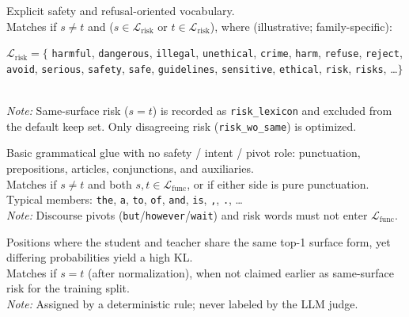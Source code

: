 \vspace{0.35em}
\begin{tcolorbox}[rubricbox,
  title={Category 3: Risk Lexicon ($\mathcal{R}_{\mathrm{risk}}$)}]
Explicit safety and refusal-oriented vocabulary.\\[3pt]
Matches if $s\neq t$ and
($s\in\mathcal{L}_{\mathrm{risk}}$ or $t\in\mathcal{L}_{\mathrm{risk}}$),
where (illustrative; family-specific):\\[2pt]
{\raggedright\sloppy
$\mathcal{L}_{\mathrm{risk}}=\{$%
\texttt{harmful}, \texttt{dangerous}, \texttt{illegal}, \texttt{unethical},
\texttt{crime}, \texttt{harm}, \texttt{refuse}, \texttt{reject},
\texttt{avoid}, \texttt{serious}, \texttt{safety}, \texttt{safe},
\texttt{guidelines}, \texttt{sensitive}, \texttt{ethical}, \texttt{risk},
\texttt{risks}, \ldots$\}$\par
}\\[2pt]
\emph{Note:} Same-surface risk ($s\!=\!t$) is recorded as
\texttt{risk\_lexicon} and excluded from the default keep set.
Only disagreeing risk (\texttt{risk\_wo\_same}) is optimized.
\end{tcolorbox}

\vspace{0.35em}
\begin{tcolorbox}[rubricbox,
  title={Category 4: Function ($\mathcal{R}_{\mathrm{function}}$)}]
Basic grammatical glue with no safety / intent / pivot role: punctuation,
prepositions, articles, conjunctions, and auxiliaries.\\[3pt]
Matches if $s\neq t$ and both
$s,t\in\mathcal{L}_{\mathrm{func}}$, or if either side is pure punctuation.\\[2pt]
Typical members:
\texttt{the}, \texttt{a}, \texttt{to}, \texttt{of}, \texttt{and}, \texttt{is},
\texttt{,}, \texttt{.}, \ldots\\[2pt]
\emph{Note:} Discourse pivots (\texttt{but}/\texttt{however}/\texttt{wait})
and risk words must not enter $\mathcal{L}_{\mathrm{func}}$.
\end{tcolorbox}

\vspace{0.35em}
\begin{tcolorbox}[rubricbox,
  title={Category 5: Consistent ($\mathcal{R}_{\mathrm{consistent}}$)}]
Positions where the student and teacher share the same top-1 surface form,
yet differing probabilities yield a high KL.\\[3pt]
Matches if $s=t$ (after normalization), when not claimed earlier as
same-surface risk for the training split.\\[2pt]
\emph{Note:} Assigned by a deterministic rule; never labeled by the LLM judge.
\end{tcolorbox}

